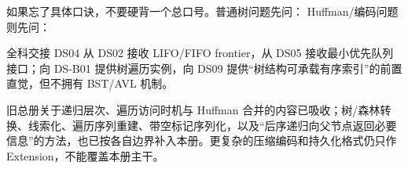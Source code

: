 \documentclass[UTF8,fontset=none,11pt,a4paper]{ctexart}
\begin{document}
如果忘了具体口诀，不要硬背一个总口号。普通树问题先问： Huffman/编码问题则先问：

\begin{corebox}{全科交接}
DS04 从 DS02 接收 LIFO/FIFO frontier，从 DS05 接收最小优先队列接口；向 DS-B01 提供树遍历实例，向 DS09 提供“树结构可承载有序索引”的前置直觉，但不拥有 BST/AVL 机制。
\end{corebox}
旧总册关于递归层次、遍历访问时机与 Huffman 合并的内容已吸收；树/森林转换、线索化、遍历序列重建、带空标记序列化，以及“后序递归向父节点返回必要信息”的方法，也已按各自边界补入本册。更复杂的压缩编码和持久化格式仍只作 Extension，不能覆盖本册主干。
\end{document}
